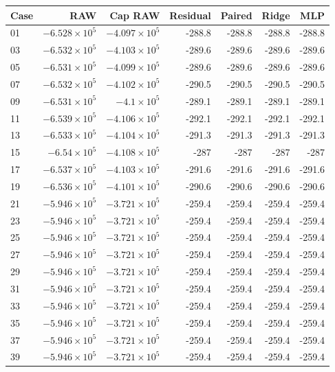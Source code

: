 \begin{tabular}{lrrrrrr}
\toprule
Case & RAW & Cap RAW & Residual & Paired & Ridge & MLP \\
\midrule
01 & \(-6.528\times10^{5}\) & \(-4.097\times10^{5}\) & -288.8 & -288.8 & -288.8 & -288.8 \\
03 & \(-6.532\times10^{5}\) & \(-4.103\times10^{5}\) & -289.6 & -289.6 & -289.6 & -289.6 \\
05 & \(-6.531\times10^{5}\) & \(-4.099\times10^{5}\) & -289.6 & -289.6 & -289.6 & -289.6 \\
07 & \(-6.532\times10^{5}\) & \(-4.102\times10^{5}\) & -290.5 & -290.5 & -290.5 & -290.5 \\
09 & \(-6.531\times10^{5}\) & \(-4.1\times10^{5}\) & -289.1 & -289.1 & -289.1 & -289.1 \\
11 & \(-6.539\times10^{5}\) & \(-4.106\times10^{5}\) & -292.1 & -292.1 & -292.1 & -292.1 \\
13 & \(-6.533\times10^{5}\) & \(-4.104\times10^{5}\) & -291.3 & -291.3 & -291.3 & -291.3 \\
15 & \(-6.54\times10^{5}\) & \(-4.108\times10^{5}\) & -287 & -287 & -287 & -287 \\
17 & \(-6.537\times10^{5}\) & \(-4.103\times10^{5}\) & -291.6 & -291.6 & -291.6 & -291.6 \\
19 & \(-6.536\times10^{5}\) & \(-4.101\times10^{5}\) & -290.6 & -290.6 & -290.6 & -290.6 \\
21 & \(-5.946\times10^{5}\) & \(-3.721\times10^{5}\) & -259.4 & -259.4 & -259.4 & -259.4 \\
23 & \(-5.946\times10^{5}\) & \(-3.721\times10^{5}\) & -259.4 & -259.4 & -259.4 & -259.4 \\
25 & \(-5.946\times10^{5}\) & \(-3.721\times10^{5}\) & -259.4 & -259.4 & -259.4 & -259.4 \\
27 & \(-5.946\times10^{5}\) & \(-3.721\times10^{5}\) & -259.4 & -259.4 & -259.4 & -259.4 \\
29 & \(-5.946\times10^{5}\) & \(-3.721\times10^{5}\) & -259.4 & -259.4 & -259.4 & -259.4 \\
31 & \(-5.946\times10^{5}\) & \(-3.721\times10^{5}\) & -259.4 & -259.4 & -259.4 & -259.4 \\
33 & \(-5.946\times10^{5}\) & \(-3.721\times10^{5}\) & -259.4 & -259.4 & -259.4 & -259.4 \\
35 & \(-5.946\times10^{5}\) & \(-3.721\times10^{5}\) & -259.4 & -259.4 & -259.4 & -259.4 \\
37 & \(-5.946\times10^{5}\) & \(-3.721\times10^{5}\) & -259.4 & -259.4 & -259.4 & -259.4 \\
39 & \(-5.946\times10^{5}\) & \(-3.721\times10^{5}\) & -259.4 & -259.4 & -259.4 & -259.4 \\
\bottomrule
\end{tabular}
